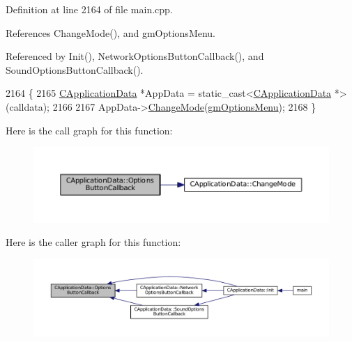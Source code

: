 Definition at line 2164 of file main.\+cpp.



References Change\+Mode(), and gm\+Options\+Menu.



Referenced by Init(), Network\+Options\+Button\+Callback(), and Sound\+Options\+Button\+Callback().


\begin{DoxyCode}
2164                                                           \{
2165     \hyperlink{classCApplicationData}{CApplicationData} *AppData = \textcolor{keyword}{static\_cast<}\hyperlink{classCApplicationData}{CApplicationData} *\textcolor{keyword}{>}(calldata);
2166                   
2167     AppData->\hyperlink{classCApplicationData_aee18c113e9a0acb3cad3d63eb19de71b}{ChangeMode}(\hyperlink{classCApplicationData_ac8ac37a4c8bb871036fbbdc6a072e403a81d2e5abad73eae4325b5ee0cc69fa3e}{gmOptionsMenu});
2168 \}
\end{DoxyCode}
Here is the call graph for this function\+:\nopagebreak
\begin{figure}[H]
\begin{center}
\leavevmode
\includegraphics[width=350pt]{classCApplicationData_a3647cf78eb59689b901d4204c81555b4_cgraph}
\end{center}
\end{figure}
Here is the caller graph for this function\+:\nopagebreak
\begin{figure}[H]
\begin{center}
\leavevmode
\includegraphics[width=350pt]{classCApplicationData_a3647cf78eb59689b901d4204c81555b4_icgraph}
\end{center}
\end{figure}
\hypertarget{classCApplicationData_a659aa43022e92610c2f8cc182eab1b8e}{}\label{classCApplicationData_a659aa43022e92610c2f8cc182eab1b8e} 
